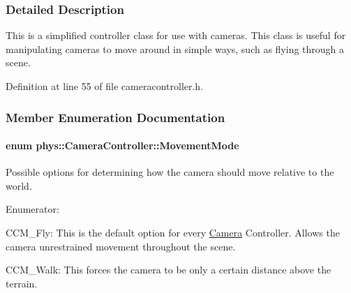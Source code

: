 \subsubsection{Detailed Description}
This is a simplified controller class for use with cameras. This class is useful for manipulating cameras to move around in simple ways, such as flying through a scene. 

Definition at line 55 of file cameracontroller.h.



\subsubsection{Member Enumeration Documentation}
\hypertarget{classphys_1_1CameraController_af7ea701f4b768a0335e8e0115d516af8}{
\paragraph[{MovementMode}]{\setlength{\rightskip}{0pt plus 5cm}enum {\bf phys::CameraController::MovementMode}}\hfill}
\label{classphys_1_1CameraController_af7ea701f4b768a0335e8e0115d516af8}


Possible options for determining how the camera should move relative to the world. 

\begin{Desc}
\item[Enumerator: ]\par
\begin{description}
\item[{\em 
\hypertarget{classphys_1_1CameraController_af7ea701f4b768a0335e8e0115d516af8a0a4e9439e82433de1e7280332f52f26d}{
CCM\_\-Fly}
\label{classphys_1_1CameraController_af7ea701f4b768a0335e8e0115d516af8a0a4e9439e82433de1e7280332f52f26d}
}]CCM\_\-Fly: This is the default option for every \hyperlink{classphys_1_1Camera}{Camera} Controller. Allows the camera unrestrained movement throughout the scene. \item[{\em 
\hypertarget{classphys_1_1CameraController_af7ea701f4b768a0335e8e0115d516af8a237d443454262ada472562d7385badac}{
CCM\_\-Walk}
\label{classphys_1_1CameraController_af7ea701f4b768a0335e8e0115d516af8a237d443454262ada472562d7385badac}
}]CCM\_\-Walk: This forces the camera to be only a certain distance above the terrain. \end{description}
\end{Desc}



